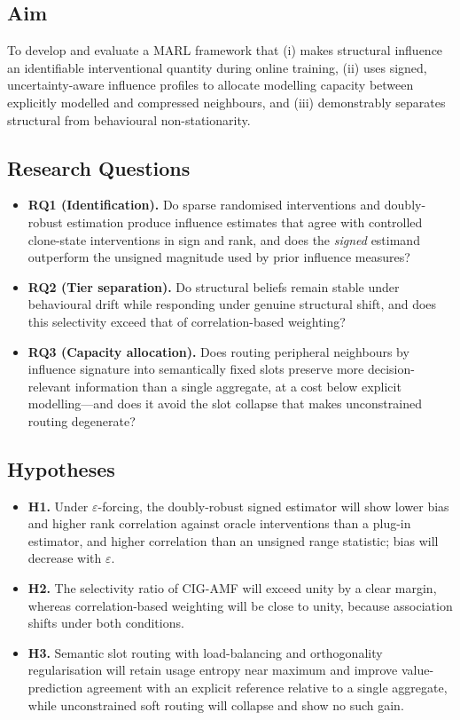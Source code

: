 \documentclass[conference]{IEEEtran}
\begin{document}
\subsection{Aim}
To develop and evaluate a MARL framework that (i) makes structural influence an identifiable interventional quantity during online training, (ii) uses signed, uncertainty-aware influence profiles to allocate modelling capacity between explicitly modelled and compressed neighbours, and (iii) demonstrably separates structural from behavioural non-stationarity.

\subsection{Research Questions}
\begin{itemize}
\item \textbf{RQ1 (Identification).} Do sparse randomised interventions and doubly-robust estimation produce influence estimates that agree with controlled clone-state interventions in sign and rank, and does the \emph{signed} estimand outperform the unsigned magnitude used by prior influence measures?
\item \textbf{RQ2 (Tier separation).} Do structural beliefs remain stable under behavioural drift while responding under genuine structural shift, and does this selectivity exceed that of correlation-based weighting?
\item \textbf{RQ3 (Capacity allocation).} Does routing peripheral neighbours by influence signature into semantically fixed slots preserve more decision-relevant information than a single aggregate, at a cost below explicit modelling---and does it avoid the slot collapse that makes unconstrained routing degenerate?
\end{itemize}

\subsection{Hypotheses}
\begin{itemize}
\item \textbf{H1.} Under $\varepsilon$-forcing, the doubly-robust signed estimator will show lower bias and higher rank correlation against oracle interventions than a plug-in estimator, and higher correlation than an unsigned range statistic; bias will decrease with $\varepsilon$.
\item \textbf{H2.} The selectivity ratio of CIG-AMF will exceed unity by a clear margin, whereas correlation-based weighting will be close to unity, because association shifts under both conditions.
\item \textbf{H3.} Semantic slot routing with load-balancing and orthogonality regularisation will retain usage entropy near maximum and improve value-prediction agreement with an explicit reference relative to a single aggregate, while unconstrained soft routing will collapse and show no such gain.
\end{itemize}
\end{document}
